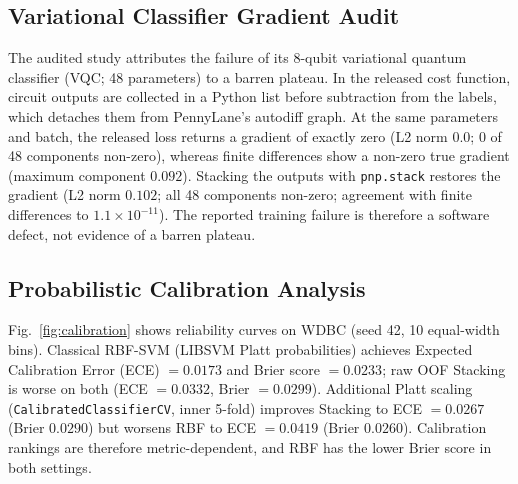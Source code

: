 \documentclass[journal,twocolumn]{IEEEtran}
\begin{document}
\subsection{Variational Classifier Gradient Audit}
\label{sec:vqc}

The audited study attributes the failure of its 8-qubit variational quantum classifier (VQC; 48 parameters) to a barren plateau. In the released cost function, circuit outputs are collected in a Python list before subtraction from the labels, which detaches them from PennyLane's autodiff graph. At the same parameters and batch, the released loss returns a gradient of exactly zero (L2 norm $0.0$; 0 of 48 components non-zero), whereas finite differences show a non-zero true gradient (maximum component $0.092$). Stacking the outputs with \texttt{pnp.stack} restores the gradient (L2 norm $0.102$; all 48 components non-zero; agreement with finite differences to $1.1\times10^{-11}$). The reported training failure is therefore a software defect, not evidence of a barren plateau.

\subsection{Probabilistic Calibration Analysis}
\label{sec:calibration}

Fig.~\ref{fig:calibration} shows reliability curves on WDBC (seed 42, 10 equal-width bins). Classical RBF-SVM (LIBSVM Platt probabilities) achieves Expected Calibration Error (ECE) $= 0.0173$ and Brier score $= 0.0233$; raw OOF Stacking is worse on both (ECE $= 0.0332$, Brier $= 0.0299$). Additional Platt scaling (\texttt{CalibratedClassifierCV}, inner 5-fold) improves Stacking to ECE $= 0.0267$ (Brier $0.0290$) but worsens RBF to ECE $= 0.0419$ (Brier $0.0260$). Calibration rankings are therefore metric-dependent, and RBF has the lower Brier score in both settings.
\end{document}
